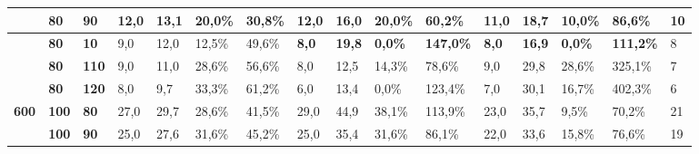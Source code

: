 \documentclass[conference,compsoc]{IEEEtran}
\begin{document}
\begin{adjustbox}{angle=90,width={\textwidth},totalheight={22cm},keepaspectratio,caption={Tabela de Resultados},center={14cm}}
\begin{tabular}{|l|l|l|l|l|l|l|l|l|l|l|l|l|l|l|l|}
\textbf{}                                            & \textbf{80}                                      & \textbf{90}                                         & 12,0            & 13,1           & 20,0\%              & 30,8\%             & 12,0            & 16,0           & 20,0\%              & 60,2\%             & 11,0            & 18,7           & 10,0\%              & 86,6\%             & 10                               \\ \hline
\textbf{}                                            & \textbf{80}                                      & \textbf{10}                                         & 9,0             & 12,0           & 12,5\%              & 49,6\%             & \textbf{8,0}    & \textbf{19,8}  & \textbf{0,0\%}      & \textbf{147,0\%}   & \textbf{8,0}    & \textbf{16,9}  & \textbf{0,0\%}      & \textbf{111,2\%}   & 8                                \\ \hline
\textbf{}                                            & \textbf{80}                                      & \textbf{110}                                        & 9,0             & 11,0           & 28,6\%              & 56,6\%             & 8,0             & 12,5           & 14,3\%              & 78,6\%             & 9,0             & 29,8           & 28,6\%              & 325,1\%            & 7                                \\ \hline
\textbf{}                                            & \textbf{80}                                      & \textbf{120}                                        & 8,0             & 9,7            & 33,3\%              & 61,2\%             & 6,0             & 13,4           & 0,0\%               & 123,4\%            & 7,0             & 30,1           & 16,7\%              & 402,3\%            & 6                                \\ \hline
\textbf{600}                                         & \textbf{100}                                     & \textbf{80}                                         & 27,0            & 29,7           & 28,6\%              & 41,5\%             & 29,0            & 44,9           & 38,1\%              & 113,9\%            & 23,0            & 35,7           & 9,5\%               & 70,2\%             & 21                               \\ \hline
\textbf{}                                            & \textbf{100}                                     & \textbf{90}                                         & 25,0            & 27,6           & 31,6\%              & 45,2\%             & 25,0            & 35,4           & 31,6\%              & 86,1\%             & 22,0            & 33,6           & 15,8\%              & 76,6\%             & 19                               \\ \hline

\end{tabular}
\end{adjustbox}
\end{document}
